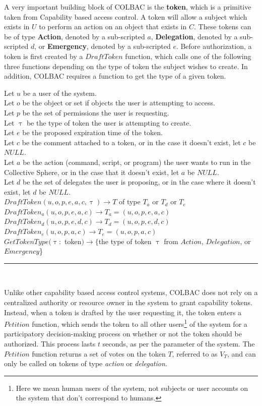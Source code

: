 \noindent A very important building block of COLBAC is the \textbf{token}, which
is a primitive taken from Capability based access control. A token will allow a
subject which exists in $U$ to perform an action on an object that exists in
$C$. These tokens can be of type \textbf{Action}, denoted by a sub-scripted $a$,
\textbf{Delegation}, denoted by a sub-scripted $d$, or \textbf{Emergency},
denoted by a sub-scripted $e$. Before authorization, a token is first created by
a $DraftToken$ function, which calls one of the following three functions
depending on the type of token the subject wishes to create. In addition, COLBAC
requires a function to get the type of a given token.
\begin{definition}\label{def:Tokens}
Let $u$ be a user of the system.\\
Let $o$ be the object or set if objects the user is attempting to access.\\
Let $p$ be the set of permissions the user is requesting.\\
Let $\uptau$ be the type of token the user is attempting to create.\\
Let $e$ be the proposed expiration time of the token.\\
Let $c$ be the comment attached to a token, or in the case it doesn't exist,
let $c$ be $NULL$.\\
Let $a$ be the action (command, script, or program) the user wants to run
in the Collective Sphere, or in the case that it doesn't exist, let $a$ be 
$NULL$.\\
Let $d$ be the set of delegates the user is proposing, or in the case where it
doesn't exist, let $d$ be $NULL$.\\
$DraftToken(u,o,p,e,a,c,\uptau) \rightarrow T$ of type $T_{a}$ or $T_{d}$ or 
$T_{e}$\\
$DraftToken_{a}(u,o,p,e,a,c) \rightarrow T_{a} = (u,o,p,e,a,c)$\\
$DraftToken_{d}(u,o,p,e,d,c) \rightarrow T_{d} = (u,o,p,e,d,c)$\\
$DraftToken_{e}(u,o,p,a,c) \rightarrow T_{e} = (u,o,p,a,c)$\\
$GetTokenType(\uptau:$ token$) \rightarrow \{$the type of token $\uptau$ from
$Action$, $Delegation$, or $Emergency$\}
\hrule \mbox{}\\
\end{definition}

\noindent Unlike other capability based access control systems, COLBAC does not
rely on a centralized authority or resource owner in the system to grant
capability tokens. Instead, when a token is drafted by the user requesting it,
the token enters a $Petition$ function, which sends the token to all other
users\footnote{Here we mean human users of the system, not subjects or user
accounts on the system that don't correspond to humans.} of the system for a
participatory decision-making process on whether or not the token should be
authorized. This process lasts $t$ seconds, as per the parameter of the system.
The $Petition$ function returns a set of votes on the token $T$, referred to as
$V_{T}$, and can only be called on tokens of type \textit{action} or
\textit{delegation.}

